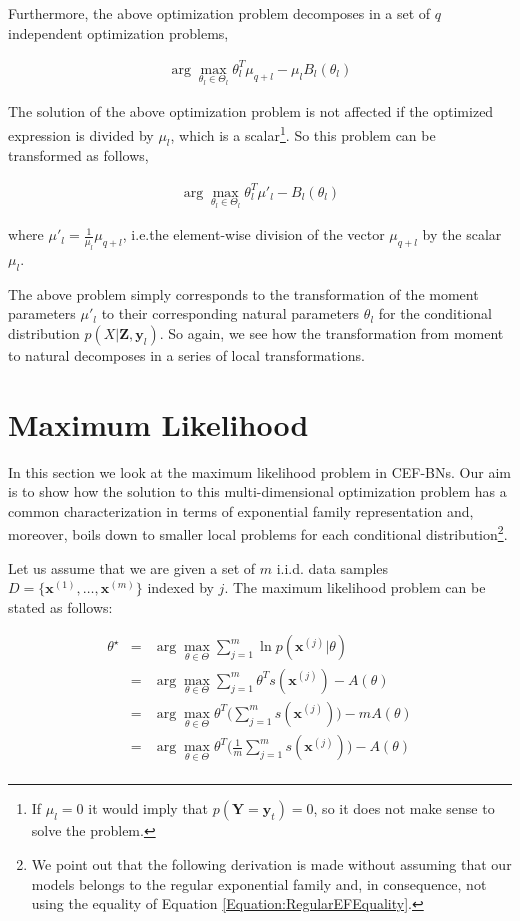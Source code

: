 \documentclass[11pt, oneside]{article}   	%
\newcommand{\bm}{\mathbf}
\numberwithin{figure}{section}
\numberwithin{equation}{section}
\numberwithin{table}{section}
\theoremstyle{definition}
\begin{document}
Furthermore, the above optimization problem decomposes in a set of $q$ independent optimization problems, 

\begin{eqnarray*}
\arg\max_{\theta_l \in \Theta_l} \theta_l^T \mu_{q+l}- \mu_l B_l(\theta_l)
\end{eqnarray*}

The solution of the above optimization problem is not affected if the optimized expression is divided by $\mu_l$, which is a scalar\footnote{If $\mu_l=0$ it would imply that $p(\bm Y= \bm y_t)=0$, so it does not make sense to solve the problem.}. So this problem can be transformed as follows, 

\begin{eqnarray}
\label{Equation:CD_With_MParents:MomentToNatural}
\arg\max_{\theta_l \in \Theta_l} \theta_l^T\mu'_l - B_l(\theta_l)
\end{eqnarray}

\noindent where $\mu'_l =\frac{1}{\mu_{l}}\mu_{q+l}$, i.e.the element-wise division of the vector $\mu_{q+l}$ by the scalar $\mu_l$.

The above problem simply corresponds to the transformation of the moment parameters $\mu'_l$ to their corresponding natural parameters $\theta_l$ for the conditional distribution $p(X|\bm Z, \bm y_l)$. So again, we see how the transformation from moment to natural decomposes in a series of local transformations. 


\section{Maximum Likelihood}

In this section we look at the maximum likelihood problem in CEF-BNs. Our aim is to show how the solution to this multi-dimensional optimization problem has a common characterization in terms of exponential family representation and, moreover, boils down to smaller local problems for each conditional distribution\footnote{We point out that the following derivation is made without assuming that our models belongs to the regular exponential family and, in consequence, not using the equality of Equation \ref{Equation:RegularEFEquality}.}.

Let us assume that we are given a set of $m$ i.i.d. data samples $D=\{\bm x^{(1)}, \ldots, \bm x^{(m)}\}$ indexed by $j$. The maximum likelihood problem can be stated as follows:

\begin{eqnarray*}
\theta^\star  &=& \arg\max_{\theta \in \Theta} \sum_{j=1}^m \ln p(\bm x^{(j)}|\theta) \\
&=& \arg\max_{\theta \in \Theta} \sum_{j=1}^m \theta^Ts(\bm x^{(j)})  - A(\theta) \\
&=& \arg\max_{\theta \in \Theta} \theta^T\Big(\sum_{j=1}^m s(\bm x^{(j)})\Big)  - m A(\theta) \\
&=& \arg\max_{\theta \in \Theta} \theta^T\Big(\frac{1}{m}\sum_{j=1}^m s(\bm x^{(j)})\Big)  - A(\theta) \\
\end{eqnarray*}
\end{document}

